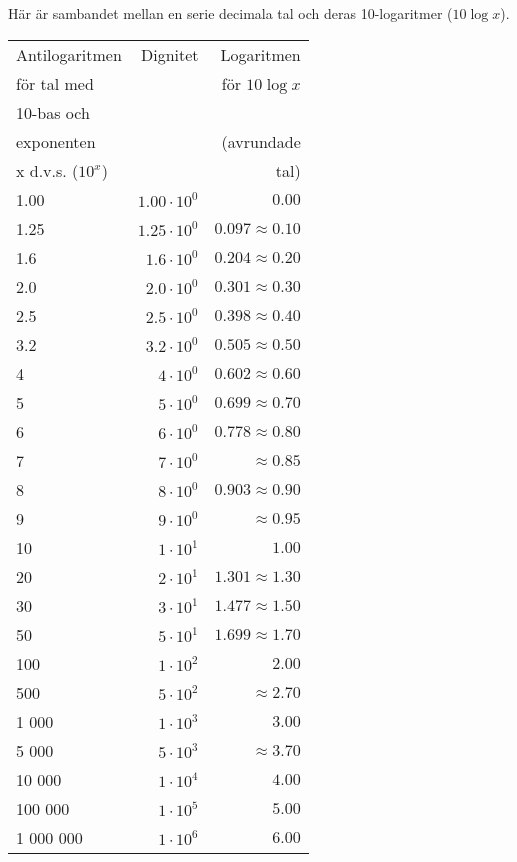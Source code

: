 Här är sambandet mellan en serie decimala tal och deras 10-logaritmer ($10\log x$).

\begin{tabular}{l|r|r}
Antilogaritmen    & Dignitet & Logaritmen            \\
för tal med       &          & för $10\log x$        \\
10-bas och        &          &                       \\
exponenten        &          & (avrundade            \\
x d.v.s. ($10^x$) &          & tal)                  \\ \hline
1.00      & $1.00 \cdot 10^0$ & $0.00$               \\
1.25      & $1.25 \cdot 10^0$ & $0.097 \approx 0.10$ \\
1.6       & $1.6 \cdot 10^0$ & $0.204 \approx 0.20$  \\
2.0       & $2.0 \cdot 10^0$ & $0.301 \approx 0.30$  \\
2.5       & $2.5 \cdot 10^0$ & $0.398 \approx 0.40$  \\
3.2       & $3.2 \cdot 10^0$ & $0.505 \approx 0.50$  \\
4         & $4 \cdot 10^0$   & $0.602 \approx 0.60$  \\
5         & $5 \cdot 10^0$   & $0.699 \approx 0.70$  \\
6         & $6 \cdot 10^0$   & $0.778 \approx 0.80$  \\
7         & $7 \cdot 10^0$   & $\approx 0.85$        \\
8         & $8 \cdot 10^0$   & $0.903 \approx 0.90$  \\
9         & $9 \cdot 10^0$   & $\approx 0.95$        \\
10        & $1 \cdot 10^1$   & $1.00$                \\
20        & $2 \cdot 10^1$   & $1.301 \approx 1.30$  \\
30        & $3 \cdot 10^1$   & $1.477 \approx 1.50$  \\
50        & $5 \cdot 10^1$   & $1.699 \approx 1.70$  \\
100       & $1 \cdot 10^2$   & $2.00$                \\
500       & $5 \cdot 10^2$   & $\approx 2.70$        \\
1 000     & $1 \cdot 10^3$   & $3.00$                \\
5 000     & $5 \cdot 10^3$   & $\approx3.70$         \\
10 000    & $1 \cdot 10^4$   & $4.00$                \\
100 000   & $1 \cdot 10^5$   & $5.00$                \\
1 000 000 & $1 \cdot 10^6$   & $6.00$                \\
\end{tabular}

